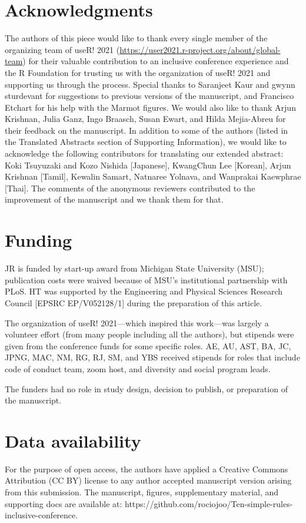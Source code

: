 \documentclass[10pt,letterpaper]{article}
\begin{document}
\section*{Acknowledgments}
The authors of this piece would like to thank every single member of the organizing team of useR! 2021 (\url{https://user2021.r-project.org/about/global-team}) for their valuable contribution to an inclusive conference experience and the R Foundation for trusting us with the organization of useR! 2021 and supporting us through the process. Special thanks to Saranjeet Kaur and gwynn sturdevant for suggestions to previous versions of the manuscript, and Francisco Etchart for his help with the Marmot figures. We would also like to thank Arjun Krishnan, Julia Ganz, Ingo Braasch, Susan Ewart, and Hilda Mejia-Abreu for their feedback on the manuscript. In addition to some of the authors (listed in the Translated Abstracts section of Supporting Information), we would like to acknowledge the following contributors for translating our extended abstract: Koki Tsuyuzaki and Kozo Nishida [Japanese], KwangChun Lee [Korean], Arjun Krishnan [Tamil], Kewalin Samart, Natnaree Yolnava, and Wanprakai Kaewphrae [Thai].
The comments of the anonymous reviewers contributed to the improvement of the manuscript and we thank them for that.

\section*{Funding}

JR is funded by start-up award from Michigan State University (MSU); publication costs were waived because of MSU’s institutional partnership with PLoS. HT was supported by the Engineering and Physical Sciences Research Council [EPSRC EP/V052128/1] during the preparation of this article.

The organization of useR! 2021---which inspired this work---was largely a volunteer effort (from many people including all the authors), but stipends were given from the conference funds for some specific roles.
AE, AU, AST, BA, JC, JPNG, MAC, NM, RG, RJ, SM, and YBS received stipends for roles that include code of conduct team, zoom host, and diversity and social program leads. 

The funders had no role in study design, decision to publish, or preparation of the manuscript.

\section*{Data availability}
For the purpose of open access, the authors have applied a Creative Commons Attribution (CC BY) license to any author accepted manuscript version arising from this submission. The manuscript, figures, supplementary material, and supporting docs are available at: https://github.com/rociojoo/Ten-simple-rules-inclusive-conference.
\end{document}
